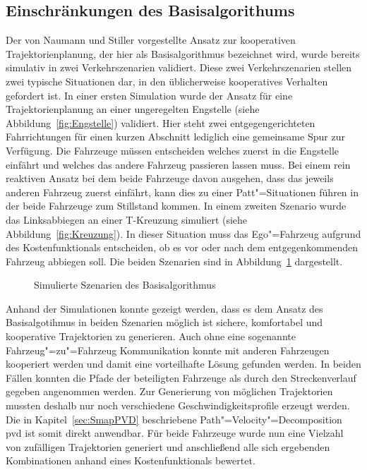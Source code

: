 \subsection{Einschr\"ankungen des Basisalgorithums}
\label{Grenzen}
Der von Naumann und Stiller \cite{Naumann2017towards} vorgestellte Ansatz zur kooperativen Trajektorienplanung, der hier als Basisalgorithmus bezeichnet wird, wurde bereits simulativ in zwei Verkehrszenarien validiert.
Diese zwei Verkehrszenarien stellen zwei typische Situationen dar, in den \"ublicherweise kooperatives Verhalten gefordert ist.
In einer ersten Simulation wurde der Ansatz f\"ur eine Trajektorienplanung an einer ungeregelten Engstelle (siehe Abbildung~\ref{fig:Engstelle}) validiert.
Hier steht zwei entgegengerichteten Fahrrichtungen f\"ur einen kurzen Abschnitt lediglich eine gemeinsame Spur zur Verf\"ugung.
Die Fahrzeuge m\"ussen entscheiden welches zuerst in die Engstelle einf\"ahrt und welches das andere Fahrzeug passieren lassen muss.
Bei einem rein reaktiven Ansatz bei dem beide Fahrzeuge davon ausgehen, dass das jeweils anderen Fahrzeug zuerst einf\"ahrt, kann dies zu einer Patt"=Situationen f\"uhren in der beide Fahrzeuge zum Stillstand kommen.
In einem zweiten Szenario wurde das Linksabbiegen an einer T-Kreuzung simuliert (siehe Abbildung~\ref{fig:Kreuzung}).
In dieser Situation muss das Ego"=Fahrzeug aufgrund des Kostenfunktionals entscheiden, ob es vor oder nach dem entgegenkommenden Fahrzeug abbiegen soll.
Die beiden Szenarien sind in Abbildung~\ref{fig:SimSzen} dargestellt.

\begin{figure}[!htbp]
    \centering
    \hfill
    \caption[Anpassung f\"ur globales Minimum]{Simulierte Szenarien des Basisalgorithmus}
    \label{fig:SimSzen}
\end{figure}

Anhand der Simulationen konnte gezeigt werden, dass es dem Ansatz des Basisalgotihmus in beiden Szenarien m\"oglich ist sichere, komfortabel und kooperative Trajektorien zu generieren.
Auch ohne eine sogenannte Fahrzeug"=zu"=Fahrzeug Kommunikation konnte mit anderen Fahrzeugen kooperiert werden und damit eine vorteilhafte L\"osung gefunden werden.
In beiden F\"allen konnten die Pfade der beteiligten Fahrzeuge als durch den Streckenverlauf gegeben angenommen werden.
Zur Generierung von m\"oglichen Trajektorien mussten deshalb nur noch verschiedene Geschwindigkeitsprofile erzeugt werden.
Die in Kapitel~\ref{sec:SmapPVD} beschriebene Path"=Velocity"=Decomposition \gls{pvd} ist somit direkt anwendbar.
F\"ur beide Fahrzeuge wurde nun eine Vielzahl von zuf\"alligen Trajektorien generiert und anschlie{\ss}end alle sich ergebenden Kombinationen anhand eines Kostenfunktionals bewertet.

